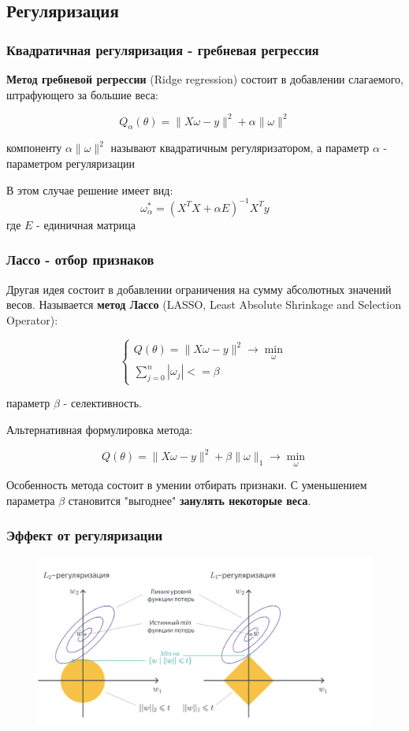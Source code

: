 \documentclass{beamer}
\begin{document}
	
	\subsection{Регуляризация}
	
	
	\begin{frame}
		\frametitle{Квадратичная регуляризация - гребневая регрессия}
		\textbf{Метод гребневой регрессии} (Ridge regression) состоит в добавлении слагаемого, штрафующего за большие веса:
		
		$$Q_{\alpha}(\theta) = \|X\omega - y\|^{2} + \alpha \|\omega\|^{2}$$
		
		компоненту $\alpha \|\omega\|^{2}$ называют квадратичным регуляризатором, а параметр $\alpha$ - параметром регуляризации
		
		\vspace{15pt}
		
		В этом случае решение имеет вид:
		$$
		\omega_{\alpha}^{*} = (X^{T}X + \alpha E)^{-1} X^{T} y
		$$
		где $E$ - единичная матрица
	\end{frame}
	
	\begin{frame}
		\frametitle{Лассо - отбор признаков}
		Другая идея состоит в добавлении ограничения на сумму абсолютных значений весов. Называется \textbf{метод Лассо} (LASSO, Least Absolute Shrinkage and Selection Operator):
		
		\[
			\begin{cases}
				Q(\theta) = \|X\omega - y\|^{2} \rightarrow \min_{\omega}
				\\
				\sum_{j=0}^{n}|\omega_{j}| <= \beta
			\end{cases}
		\]
		
		параметр $\beta$ - селективность.
		
		
		Альтернативная формулировка метода:
		
		\[
		Q(\theta) = \|X\omega - y\|^{2} + \beta \|\omega\|_{1} \rightarrow \min_{\omega}
		\] 
		
		Особенность метода состоит в умении отбирать признаки. С уменьшением параметра $\beta$ становится "выгоднее" \textbf{занулять некоторые веса}.
	\end{frame}
	
	
	\begin{frame}
		\frametitle{Эффект от регуляризации}
		\begin{figure}[h]
			\includegraphics[width=\paperwidth, ]{img/l1_l2_regul.png}
		\end{figure}
	\end{frame}
	
\end{document}
